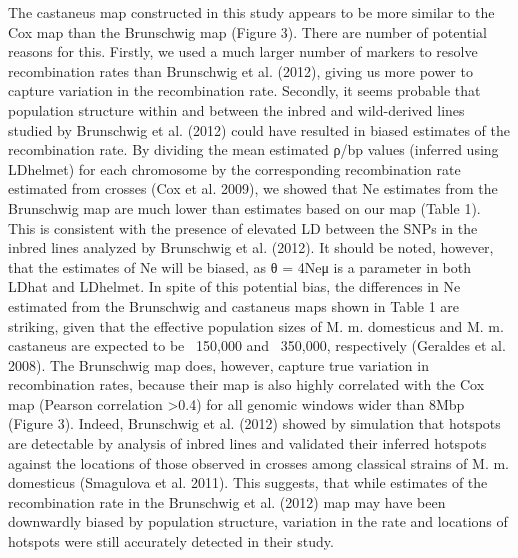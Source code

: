 The castaneus map constructed in this study appears to be more similar to the Cox map than the Brunschwig map (Figure 3). There are number of potential reasons for this. Firstly, we used a much larger number of markers to resolve recombination rates than Brunschwig et al. (2012), giving us more power to capture variation in the recombination rate. Secondly, it seems probable that population structure within and between the inbred and wild-derived lines studied by Brunschwig et al. (2012) could have resulted in biased estimates of the recombination rate. By dividing the mean estimated ρ/bp values (inferred using LDhelmet) for each chromosome by the corresponding recombination rate estimated from crosses (Cox et al. 2009), we showed that Ne estimates from the Brunschwig map are much lower than estimates based on our map (Table 1). This is consistent with the presence of elevated LD between the SNPs in the inbred lines analyzed by Brunschwig et al. (2012). It should be noted, however, that the estimates of Ne will be biased, as θ = 4Neμ is a parameter in both LDhat and LDhelmet. In spite of this potential bias, the differences in Ne estimated from the Brunschwig and castaneus maps shown in Table 1 are striking, given that the effective population sizes of M. m. domesticus and M. m. castaneus are expected to be ~150,000 and ~350,000, respectively (Geraldes et al. 2008). The Brunschwig map does, however, capture true variation in recombination rates, because their map is also highly correlated with the Cox map (Pearson correlation >0.4) for all genomic windows wider than 8Mbp (Figure 3). Indeed, Brunschwig et al. (2012) showed by simulation that hotspots are detectable by analysis of inbred lines and validated their inferred hotspots against the locations of those observed in crosses among classical strains of M. m. domesticus (Smagulova et al. 2011). This suggests, that while estimates of the recombination rate in the Brunschwig et al. (2012) map may have been downwardly biased by population structure, variation in the rate and locations of hotspots were still accurately detected in their study.
 
